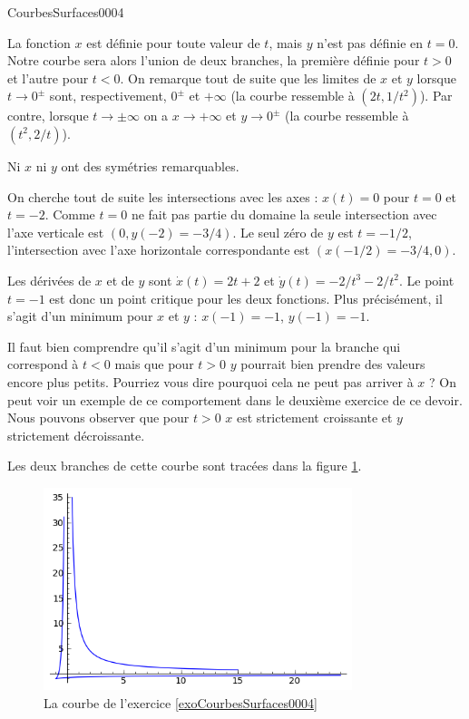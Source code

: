 \begin{corrige}{CourbesSurfaces0004}

La fonction $x$ est définie pour toute valeur de $t$, mais $y$ n'est pas définie en $t=0$. Notre courbe sera alors l'union de deux branches, la première définie pour $t>0$ et l'autre pour $t<0$. On remarque tout de suite que les limites de $x$ et $y$ lorsque $t\to 0^{\pm}$ sont, respectivement, $0^\pm$ et $+\infty$ (la courbe ressemble à $(2t, 1/t^2)$). Par contre, lorsque $t\to \pm\infty$ on a $x\to +\infty$ et $y\to 0^\pm$ (la courbe ressemble à $(t^2, 2/t)$). 

Ni $x$ ni $y$ ont des symétries remarquables. 

On cherche tout de suite les intersections avec les axes : $x(t)=0$ pour $t=0$ et $t=-2$. Comme $t=0$ ne fait pas partie du domaine la seule intersection avec l'axe verticale est $(0, y(-2)=-3/4)$. Le seul zéro de $y$ est $t=-1/2$, l'intersection avec l'axe horizontale correspondante est $(x(-1/2)=-3/4,0)$. 

Les dérivées de $x$ et de $y$ sont $\dot x (t)= 2t+2 $ et $\dot y(t)= -2/t^3-2/t^2$. Le point $t=-1$ est donc un point critique pour les deux fonctions. Plus précisément, il s'agit d'un minimum pour $x$ et $y$ : $x(-1)=-1$, $y(-1)= -1$.

 Il faut bien comprendre qu'il s'agit  d'un minimum pour la branche qui correspond à  $t<0$ mais que pour $t>0$ $y$ pourrait bien prendre des valeurs encore plus petits. Pourriez vous dire pourquoi cela ne peut pas arriver à $x$ ? On peut voir un exemple de ce comportement dans le deuxième exercice de ce devoir.   
Nous pouvons observer que pour $t>0$ $x$ est strictement croissante et $y$ strictement décroissante. 

Les deux branches de cette courbe sont tracées dans la figure \ref{figdevoir3exo1}.

\begin{figure}
  \begin{center}
    \includegraphics[width=9cm]{figdevoir3exo1.png}

  \caption{La courbe de l'exercice \ref{exoCourbesSurfaces0004}}\label{figdevoir3exo1}
  \end{center}
 \end{figure}
\end{corrige}
